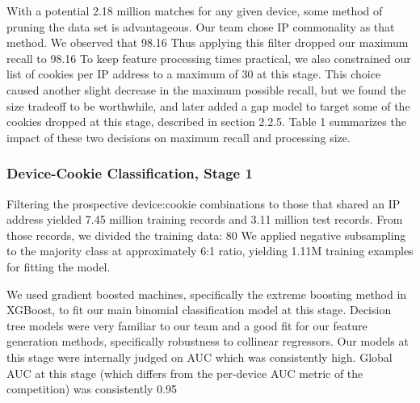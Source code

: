 \documentclass[9pt, journal]{IEEEtran}
\begin{document}
With a potential 2.18 million matches for any given device, some method of pruning the data set is advantageous. 
Our team chose IP commonality as that method. We observed that 98.16%
Thus applying this filter dropped our maximum recall to 98.16%
To keep feature processing times practical, we also constrained our list of cookies per IP address to a maximum of 30 at this stage.
This choice caused another slight decrease in the maximum possible recall, but we found the size tradeoff to be worthwhile, and later added a gap model to target some of the cookies dropped at this stage, described in section 2.2.5. 
Table 1 summarizes the impact of these two decisions on maximum recall and processing size.  



\subsubsection{Device-Cookie Classification, Stage 1}
Filtering the prospective device:cookie combinations to those that shared an IP address yielded 7.45 million training records and 3.11 million test records.
From those records, we divided the training data: 80%
We applied negative subsampling to the majority class at approximately 6:1 ratio, yielding 1.11M training examples for fitting the model.

We used gradient boosted machines, specifically the extreme boosting method in XGBoost, to fit our main binomial classification model at this stage.
Decision tree models were very familiar to our team and a good fit for our feature generation methods, specifically robustness to collinear regressors. 
Our models at this stage were internally judged on AUC which was consistently high. Global AUC at this stage (which differs from the per-device AUC metric of the competition) was consistently 0.95


\end{document}
